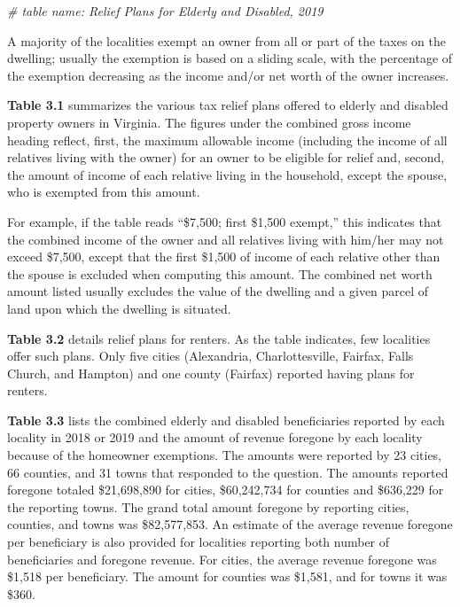 \documentclass[
]{book}
\newenvironment{Shaded}{\begin{snugshade}}{\end{snugshade}}
\newcommand{\CommentTok}[1]{\textcolor[rgb]{0.56,0.35,0.01}{\textit{#1}}}
\begin{document}
\begin{Shaded}
\begin{Highlighting}[]
\CommentTok{\# table name: Relief Plans for Elderly and Disabled, 2019}
\end{Highlighting}
\end{Shaded}

A majority of the localities exempt an owner from all or part of the taxes on the dwelling; usually the exemption is based on a sliding scale, with the percentage of the exemption decreasing as the income and/or net worth of the owner increases.

\textbf{Table 3.1} summarizes the various tax relief plans offered to elderly and disabled property owners in Virginia. The figures under the combined gross income heading reflect, first, the maximum allowable income (including the income of all relatives living with the owner) for an owner to be eligible for relief and, second, the amount of income of each relative living in the household, except the spouse, who is exempted from this amount.

For example, if the table reads ``\$7,500; first \$1,500 exempt,'' this indicates that the combined income of the owner and all relatives living with him/her may not exceed \$7,500, except that the first \$1,500 of income of each relative other than the spouse is excluded when computing this amount. The combined net worth amount listed usually excludes the value of the dwelling and a given parcel of land upon which the dwelling is situated.

\textbf{Table 3.2} details relief plans for renters. As the table indicates, few localities offer such plans. Only five cities (Alexandria, Charlottesville, Fairfax, Falls Church, and Hampton) and one county (Fairfax) reported having plans for renters.

\textbf{Table 3.3} lists the combined elderly and disabled beneficiaries reported by each locality in 2018 or 2019 and the amount of revenue foregone by each locality because of the homeowner exemptions. The amounts were reported by 23 cities, 66 counties, and 31 towns that responded to the question. The amounts reported foregone totaled \$21,698,890 for cities, \$60,242,734 for counties and \$636,229 for the reporting towns. The grand total amount foregone by reporting cities, counties, and towns was \$82,577,853. An estimate of the average revenue foregone per beneficiary is also provided for localities reporting both number of beneficiaries and foregone revenue. For cities, the average revenue foregone was \$1,518 per beneficiary. The amount for counties was \$1,581, and for towns it was \$360.
\end{document}
